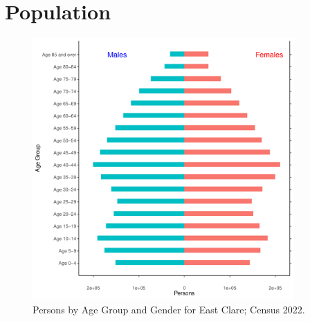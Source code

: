 \documentclass{article}
\begin{document}
\pagebreak

\section{Population} 
\label{sect:Pop}

\begin{figure}[h]
	\centering
	\includegraphics[width = 100mm]{../figures/PyramidPlot.pdf}
	\caption{Persons by Age Group and Gender for East Clare; Census 2022.}
	\label{fig:2ae19629-1a6a-13a3-e055-000000000001}
	\end{figure}
\end{document}
